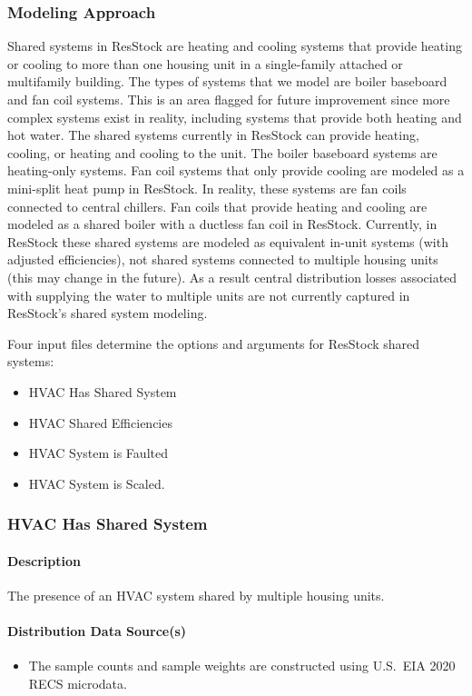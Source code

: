 \subsubsection{Modeling Approach}
Shared systems in ResStock are heating and cooling systems that provide heating or cooling to more than one housing unit in a single-family attached or multifamily building. The types of systems that we model are boiler baseboard and fan coil systems. This is an area flagged for future improvement since more complex systems exist in reality, including systems that provide both heating and hot water. The shared systems currently in ResStock can provide heating, cooling, or heating and cooling to the unit. The boiler baseboard systems are heating-only systems. Fan coil systems that only provide cooling are modeled as a mini-split heat pump in ResStock. In reality, these systems are fan coils connected to central chillers. Fan coils that provide heating and cooling are modeled as a shared boiler with a ductless fan coil in ResStock. Currently, in ResStock these shared systems are modeled as equivalent in-unit systems (with adjusted efficiencies), not shared systems connected to multiple housing units (this may change in the future). As a result central distribution losses associated with supplying the water to multiple units are not currently captured in ResStock's shared system modeling.

Four input files determine the options and arguments for ResStock shared systems:
\begin{itemize}
    \item HVAC Has Shared System
    \item HVAC Shared Efficiencies
    \item HVAC System is Faulted
    \item HVAC System is Scaled.
\end{itemize}

\subsubsection{HVAC Has Shared System}
\paragraph{Description}
The presence of an HVAC system shared by multiple housing units.

\paragraph{Distribution Data Source(s)}
\begin{itemize}
\item The sample counts and sample weights are constructed using U.S.~EIA 2020 RECS microdata.
\end{itemize}


